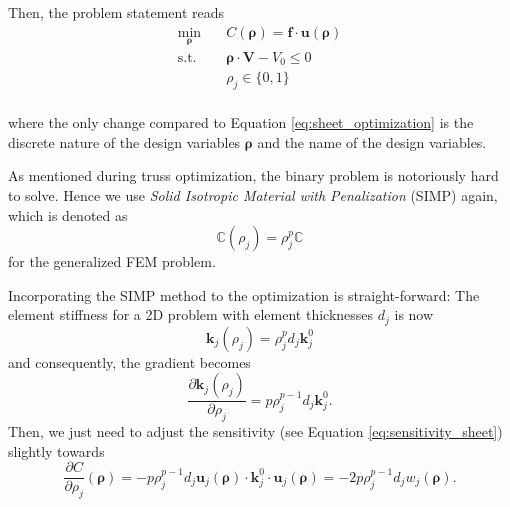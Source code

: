 Then, the problem statement reads
\begin{equation}
    \begin{aligned}
        \min_{\pmb{\rho}} \quad & C(\pmb{\rho}) = \mathbf{f} \cdot \mathbf{u}(\pmb{\rho})\\
        \textrm{s.t.} \quad & \pmb{\rho} \cdot \mathbf{V} - V_0 \le 0  \\
                            & \rho_j \in \{0, 1\}\\
    \end{aligned}
    \label{eq:topology_optimization}
\end{equation}

where the only change compared to Equation \eqref{eq:sheet_optimization} is the discrete nature of the design variables $\pmb{\rho}$ and the name of the design variables. 


As mentioned during truss optimization, the binary problem is notoriously hard to solve. Hence we use \emph{Solid Isotropic Material with Penalization} (SIMP) again, which is denoted as 
\begin{equation}
    \mathbb{C}(\rho_j)= \rho_j^p \mathbb{C}
\end{equation}
for the generalized FEM problem. 

Incorporating the SIMP method to the optimization is straight-forward: The element stiffness for a 2D problem with element thicknesses $d_j$ is now 
\begin{equation}
    \mathbf{k}_j(\rho_j) =  \rho_j^p d_j \mathbf{k}^0_j
\end{equation}
and consequently, the gradient becomes 
\begin{equation}
    \frac{\partial\mathbf{k}_j(\rho_j)}{\partial \rho_j} =  p \rho_j^{p-1}  d_j\mathbf{k}^0_j.
\end{equation}
Then, we just need to adjust the sensitivity (see Equation \ref{eq:sensitivity_sheet}) slightly towards
\begin{equation}
    \frac{\partial C}{\partial \rho_j} (\pmb{\rho}) = - p \rho_j^{p-1} d_j\mathbf{u}_j(\pmb{\rho})  \cdot \mathbf{k}^0_j \cdot \mathbf{u}_j(\pmb{\rho}) = -2 p \rho_j^{p-1} d_j w_j(\pmb{\rho}).
    \label{eq:sensitivity_topology}
\end{equation}

